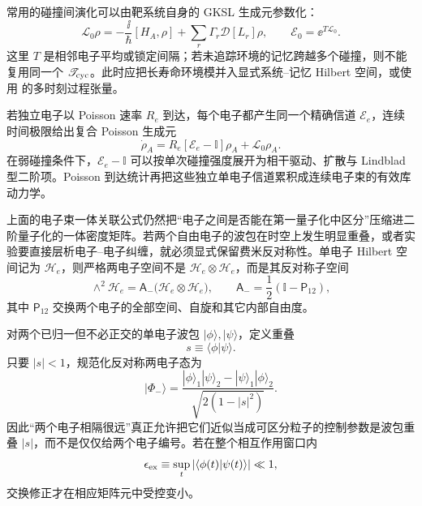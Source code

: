 常用的碰撞间演化可以由靶系统自身的 GKSL 生成元参数化：
\begin{equation}
\boxed{
\mathcal L_0\rho
=-\frac{\ii}{\hbar}[H_A,\rho]
+\sum_r\Gamma_r\mathcal D[L_r]\rho,
\qquad
\mathscr E_0=\ee^{T\mathcal L_0}.}
\label{eq:general_target_intercollision_lindblad}
\end{equation}
这里 $T$ 是相邻电子平均或锁定间隔；若未追踪环境的记忆跨越多个碰撞，则不能复用同一个 $\mathscr T_{\rm cyc}$。此时应把长寿命环境模并入显式系统--记忆 Hilbert 空间，或使用 的多时刻过程张量。

若独立电子以 Poisson 速率 $R_e$ 到达，每个电子都产生同一个精确信道 $\mathscr E_e$，连续时间极限给出复合 Poisson 生成元
\begin{equation*}
\dot\rho_A=R_e[\mathscr E_e-\mathbb I]\rho_A+\mathcal L_0\rho_A.
\end{equation*}
在弱碰撞条件下，$\mathscr E_e-\mathbb I$ 可以按单次碰撞强度展开为相干驱动、扩散与 Lindblad 型二阶项。Poisson 到达统计再把这些独立单电子信道累积成连续电子束的有效库动力学。

上面的电子束一体关联公式仍然把“电子之间是否能在第一量子化中区分”压缩进二阶量子化的一体密度矩阵。若两个自由电子的波包在时空上发生明显重叠，或者实验要直接层析电子--电子纠缠，就必须显式保留费米反对称性。单电子 Hilbert 空间记为 $\mathcal H_e$，则严格两电子空间不是
$\mathcal H_e\otimes\mathcal H_e$，而是其反对称子空间
\[
\wedge^2\mathcal H_e
=\mathsf A_-\bigl(\mathcal H_e\otimes\mathcal H_e\bigr),
\qquad
\mathsf A_-=\frac12(\mathbb I-\mathsf P_{12}),
\]
其中 $\mathsf P_{12}$ 交换两个电子的全部空间、自旋和其它内部自由度。

对两个已归一但不必正交的单电子波包 $|\phi\rangle,|\psi\rangle$，定义重叠
\[
s\equiv\langle\phi|\psi\rangle .
\]
只要 $|s|<1$，规范化反对称两电子态为
\begin{equation}
\boxed{
|\Phi_-\rangle
=
\frac{
|\phi\rangle_1|\psi\rangle_2
-
|\psi\rangle_1|\phi\rangle_2
}{
\sqrt{2(1-|s|^2)}
}.}
\label{eq:two_electron_antisym_wavepacket_state}
\end{equation}
因此“两个电子相隔很远”真正允许把它们近似当成可区分粒子的控制参数是波包重叠 $|s|$，而不是仅仅给两个电子编号。若在整个相互作用窗口内
\[
\epsilon_{\rm ex}
\equiv
\sup_t|\langle\phi(t)|\psi(t)\rangle|
\ll1,
\]
交换修正才在相应矩阵元中受控变小。


